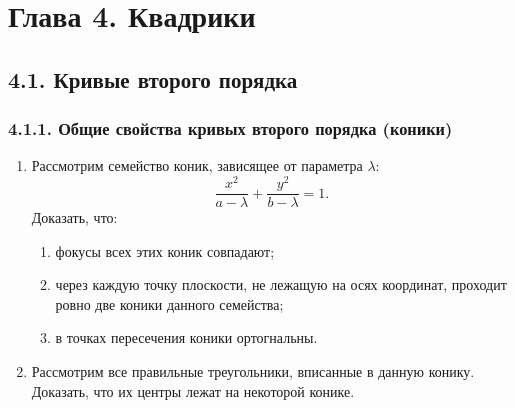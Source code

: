 % 
%
% 

\section{Глава 4. Квадрики}

\subsection{4.1. Кривые второго порядка}

\subsubsection*{4.1.1. Общие свойства кривых второго порядка (коники)}

\begin{enumerate}

	\item Рассмотрим семейство коник, зависящее от параметра $\lambda$:
	\[
		\frac{x^2}{a - \lambda} + \frac{y^2}{b - \lambda} = 1.
	\]
	Доказать, что:
	\begin{enumerate}
		\item фокусы всех этих коник совпадают;
		\item через каждую точку плоскости, не лежащую на осях координат, проходит ровно две коники данного семейства;
		\item в точках пересечения коники ортогнальны.
	\end{enumerate}

	\item Рассмотрим все правильные треугольники, вписанные в данную конику. Доказать, что их центры лежат на некоторой конике.

\end{enumerate}
